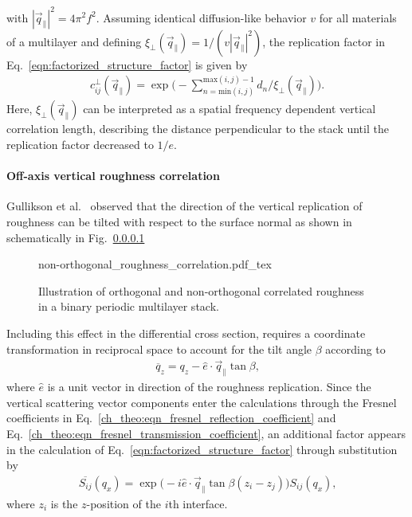 with $|\vec{q}_\parallel|^2 = 4 \pi^2 f^2$. Assuming identical diffusion-like behavior $v$ for all materials of a multilayer and defining $\xi_\perp(\vec{q}_\parallel) = 1/(v |\vec{q}_\parallel|^2)$, the replication factor in Eq.~\eqref{eqn:factorized_structure_factor} is given by
\begin{align}
c_{ij}^\perp(\vec{q}_\parallel) =  \exp\Bigg(-\sum \limits_{n = \text{min}(i,j)}^{\text{max}(i,j)-1}d_n/\xi_\perp(\vec{q}_\parallel) \Bigg)\text{.} \label{ch_theo:eqn_replication_factor}
\end{align}
Here, $\xi_\perp(\vec{q}_\parallel)$ can be interpreted as a spatial frequency dependent vertical correlation length, describing the distance perpendicular to the stack until the replication factor decreased to $1/e$.



\paragraph{Off-axis vertical roughness correlation}
Gullikson et al.~\cite{gullikson_asymmetric_1999} observed that the direction of the vertical replication of roughness can be tilted with respect to the surface normal as shown in schematically in Fig.~\ref{}
\begin{figure}[htb]
    \def\svgwidth{\textwidth}
    {non-orthogonal_roughness_correlation.pdf_tex}
    \caption{Illustration of orthogonal and non-orthogonal correlated roughness in a binary periodic multilayer stack.}
    \label{ch_theo:fig_non-orthogonal_vertical_roughness_correlation}
\end{figure}
Including this effect in the differential cross section, requires a coordinate transformation in reciprocal space to account for the tilt angle $\beta$ according to
\begin{align}
\overline{q}_z = q_z - \hat{e} \cdot \vec{q}_\parallel   \tan \beta\text{,}
\end{align}
where $\hat{e}$ is a unit vector in direction of the roughness replication. Since the vertical scattering vector components enter the calculations through the Fresnel coefficients in Eq.~\eqref{ch_theo:eqn_fresnel_reflection_coefficient} and Eq.~\eqref{ch_theo:eqn_fresnel_transmission_coefficient}, an additional factor appears in the calculation of Eq.~\eqref{eqn:factorized_structure_factor} through substitution by
\begin{align}
\overline{S_{ij}}(q_x) = \exp\Big(-i \hat{e} \cdot \vec{q}_\parallel \tan \beta (z_i-z_j)\Big)  S_{ij}(q_x) \text{,} \label{eqn:tilt_correction}
\end{align}
where $z_i$ is the $z$-position of the $i$th interface.

